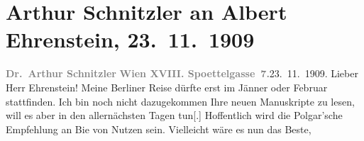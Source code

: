 

         
         \renewcommand{\erwaehntePersonen}{Personen: Oskar Bie, Albert Ehrenstein, Samuel Fischer, Alfred Polgar}
         \renewcommand{\erwaehnteInstitutionen}{Institutionen: Neue Rundschau, Neue Deutsche Rundschau, Freie Bühne, S. Fischer Verlag}
         \renewcommand{\erwaehnteOrte}{Orte: Berlin, Edmund-Weiß-Gasse, Wien}
         \renewcommand{\erwaehnteWerke}{}
               \section[Arthur Schnitzler an Albert Ehrenstein, 23. 11. 1909]{ Arthur Schnitzler an Albert Ehrenstein, 23. 11. 1909}\nopagebreak{}\rehead{ }\begin{ledgroupsized}[t]{13cm}\normalsize\beginnumbering \toendnotes[C]{\smallbreak\pagebreak[2]} 
\toendnotes[C]{\smallbreak}\pstart
           \noindent{}{\pb}\textcolor{gray}{\textbf{Dr. Arthur Schnitzler}}\pend
           \pstart
           \textcolor{gray}{\textbf{Wien XVIII. Spoettelgasse 7.}}\hfill 23. 11. 1909.\pend
           \pstart{}Lieber Herr Ehrenstein! \pend\pstart
           Meine Berliner Reise dürfte erst im
                        Jänner oder Februar stattfinden. Ich bin noch
                    nicht dazugekommen Ihre neuen Manuskripte zu lesen, will es aber in den
                    allernächsten Tagen tun{[}.{]} Hoffentlich
                     wird die
                        Polgar’sche Empfehlung an Bie von Nutzen sein. Vielleicht wäre es nun das Beste,

\end{ledgroupsized}
